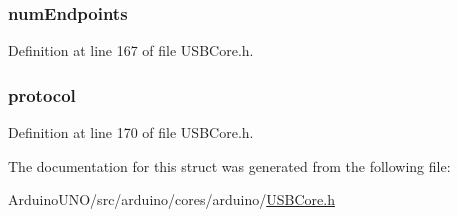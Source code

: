 \subsubsection[{num\+Endpoints}]{ num\+Endpoints}\label{struct_interface_descriptor_afe8ecc909a70e40b9aaf4423fb495678}


Definition at line 167 of file U\+S\+B\+Core.\+h.

\hypertarget{struct_interface_descriptor_a7354e97cb32f39427d6195c914ee2abd}{}
\subsubsection[{protocol}]{ protocol}\label{struct_interface_descriptor_a7354e97cb32f39427d6195c914ee2abd}


Definition at line 170 of file U\+S\+B\+Core.\+h.



The documentation for this struct was generated from the following file\+:\begin{DoxyCompactItemize}
\item 
Arduino\+U\+N\+O/src/arduino/cores/arduino/\hyperlink{_u_s_b_core_8h}{U\+S\+B\+Core.\+h}\end{DoxyCompactItemize}
